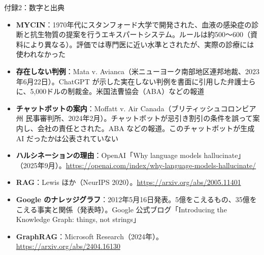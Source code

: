 \documentclass[aspectratio=169]{beamer}
\begin{document}
\begin{frame}{付録2：数字と出典}
\footnotesize
\begin{itemize}
  \item \textbf{MYCIN}：1970年代にスタンフォード大学で開発された、血液の感染症の診断と抗生物質の提案を行うエキスパートシステム。ルールは約500〜600（資料により異なる）。評価では専門医に近い水準とされたが、実際の診療には使われなかった
  \item \textbf{存在しない判例}：Mata v. Avianca（米ニューヨーク南部地区連邦地裁、2023年6月22日）。ChatGPT が示した実在しない判例を書面に引用した弁護士らに、5,000ドルの制裁金。米国法曹協会（ABA）などの報道
  \item \textbf{チャットボットの案内}：Moffatt v. Air Canada（ブリティッシュコロンビア州 民事審判所、2024年2月）。チャットボットが忌引き割引の条件を誤って案内し、会社の責任とされた。ABA などの報道。このチャットボットが生成 AI だったかは公表されていない
  \item \textbf{ハルシネーションの理由}：OpenAI「Why language models hallucinate」（2025年9月）。\url{https://openai.com/index/why-language-models-hallucinate/}
  \item \textbf{RAG}：Lewis ほか（NeurIPS 2020）。\url{https://arxiv.org/abs/2005.11401}
  \item \textbf{Google のナレッジグラフ}：2012年5月16日発表。5億をこえるもの、35億をこえる事実と関係（発表時）。Google 公式ブログ「Introducing the Knowledge Graph: things, not strings」
  \item \textbf{GraphRAG}：Microsoft Research（2024年）。\url{https://arxiv.org/abs/2404.16130}
\end{itemize}
\end{frame}
\end{document}

